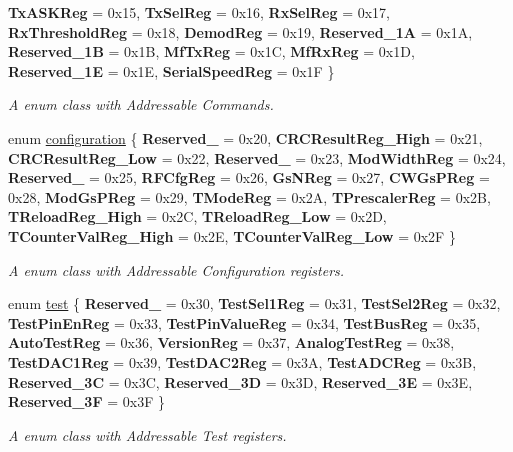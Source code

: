 \begin{DoxyCompactItemize}
{\bfseries Tx\+A\+S\+K\+Reg} = 0x15, 
{\bfseries Tx\+Sel\+Reg} = 0x16, 
{\bfseries Rx\+Sel\+Reg} = 0x17, 
\newline
{\bfseries Rx\+Threshold\+Reg} = 0x18, 
{\bfseries Demod\+Reg} = 0x19, 
{\bfseries Reserved\+\_\+1A} = 0x1A, 
{\bfseries Reserved\+\_\+1B} = 0x1B, 
\newline
{\bfseries Mf\+Tx\+Reg} = 0x1C, 
{\bfseries Mf\+Rx\+Reg} = 0x1D, 
{\bfseries Reserved\+\_\+1E} = 0x1E, 
{\bfseries Serial\+Speed\+Reg} = 0x1F
 \}\begin{DoxyCompactList}\small\item\em A enum class with Addressable Commands. \end{DoxyCompactList}
\item 
enum \hyperlink{classrc522_afcf27c8198d017cd4e8173c7d7a6fded}{configuration} \{ \newline
{\bfseries Reserved\+\_} = 0x20, 
{\bfseries C\+R\+C\+Result\+Reg\+\_\+\+High} = 0x21, 
{\bfseries C\+R\+C\+Result\+Reg\+\_\+\+Low} = 0x22, 
{\bfseries Reserved\+\_} = 0x23, 
\newline
{\bfseries Mod\+Width\+Reg} = 0x24, 
{\bfseries Reserved\+\_} = 0x25, 
{\bfseries R\+F\+Cfg\+Reg} = 0x26, 
{\bfseries Gs\+N\+Reg} = 0x27, 
\newline
{\bfseries C\+W\+Gs\+P\+Reg} = 0x28, 
{\bfseries Mod\+Gs\+P\+Reg} = 0x29, 
{\bfseries T\+Mode\+Reg} = 0x2A, 
{\bfseries T\+Prescaler\+Reg} = 0x2B, 
\newline
{\bfseries T\+Reload\+Reg\+\_\+\+High} = 0x2C, 
{\bfseries T\+Reload\+Reg\+\_\+\+Low} = 0x2D, 
{\bfseries T\+Counter\+Val\+Reg\+\_\+\+High} = 0x2E, 
{\bfseries T\+Counter\+Val\+Reg\+\_\+\+Low} = 0x2F
 \}\begin{DoxyCompactList}\small\item\em A enum class with Addressable Configuration registers. \end{DoxyCompactList}
\item 
enum \hyperlink{classrc522_a9589917c9bbcd18ea9c7d86c7ec565bd}{test} \{ \newline
{\bfseries Reserved\+\_} = 0x30, 
{\bfseries Test\+Sel1\+Reg} = 0x31, 
{\bfseries Test\+Sel2\+Reg} = 0x32, 
{\bfseries Test\+Pin\+En\+Reg} = 0x33, 
\newline
{\bfseries Test\+Pin\+Value\+Reg} = 0x34, 
{\bfseries Test\+Bus\+Reg} = 0x35, 
{\bfseries Auto\+Test\+Reg} = 0x36, 
{\bfseries Version\+Reg} = 0x37, 
\newline
{\bfseries Analog\+Test\+Reg} = 0x38, 
{\bfseries Test\+D\+A\+C1\+Reg} = 0x39, 
{\bfseries Test\+D\+A\+C2\+Reg} = 0x3A, 
{\bfseries Test\+A\+D\+C\+Reg} = 0x3B, 
\newline
{\bfseries Reserved\+\_\+3C} = 0x3C, 
{\bfseries Reserved\+\_\+3D} = 0x3D, 
{\bfseries Reserved\+\_\+3E} = 0x3E, 
{\bfseries Reserved\+\_\+3F} = 0x3F
 \}\begin{DoxyCompactList}\small\item\em A enum class with Addressable Test registers. \end{DoxyCompactList}
\end{DoxyCompactItemize}
